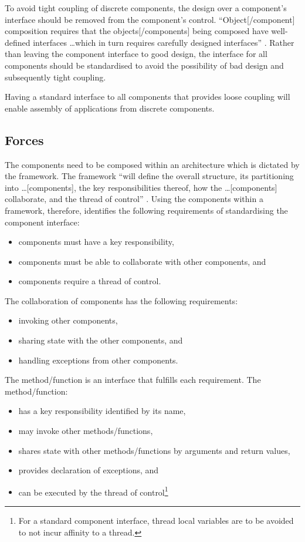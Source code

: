 \documentclass[prodmode]{style/acmlarge}
\begin{document}
To avoid tight coupling of discrete components, the design over a component's
interface should be removed from the component's control. ``Object[/component]
composition requires that the objects[/components] being composed have
well-defined interfaces \ldots which in turn requires carefully designed
interfaces'' \cite[p. 19]{gof}.  Rather than leaving the component interface to
good design, the interface for all components should be standardised to avoid
the possibility of bad design and subsequently tight coupling.

Having a standard interface to all components that provides loose coupling will
enable assembly of applications from discrete components.


\subsection{Forces}

The components need to be composed within an architecture which is dictated by
the framework.  The framework ``will define the overall structure, its
partitioning into \ldots [components], the key responsibilities thereof, how the
\ldots [components] collaborate, and the thread of control'' \cite[p.26]{gof}. 
Using the components within a framework, therefore, identifies the following
requirements of standardising the component interface:
\begin{itemize}
  \item components must have a key responsibility,
  \item components must be able to collaborate with other components, and
  \item components require a thread of control.
\end{itemize}

The collaboration of components has the following requirements:
\begin{itemize}
  \item invoking other components,
  \item sharing state with the other components, and
  \item handling exceptions from other components.
\end{itemize}

The method/function is an interface that fulfills each requirement.  The method/function:
\begin{itemize}
  \item has a key responsibility identified by its name,
  \item may invoke other methods/functions,
  \item shares state with other methods/functions by arguments and return values,
  \item provides declaration of exceptions, and
  \item can be executed by the thread of control\footnote{For a standard component interface, thread local variables are to be avoided to not incur affinity to a thread.}
\end{itemize}
\end{document}
